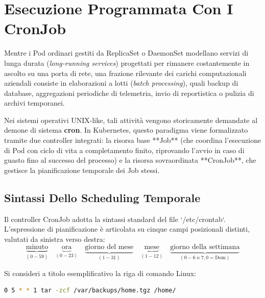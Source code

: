 \documentclass[11pt, a4paper]{article}
\begin{document}
\newpage


\section{Esecuzione Programmata Con I CronJob}

Mentre i Pod ordinari gestiti da ReplicaSet o DaemonSet modellano servizi di lunga durata (\emph{long-running services}) progettati per rimanere costantemente in ascolto su una porta di rete, una frazione rilevante dei carichi computazionali aziendali consiste in elaborazioni a lotti (\emph{batch processing}), quali backup di database, aggregazioni periodiche di telemetria, invio di reportistica o pulizia di archivi temporanei.

Nei sistemi operativi UNIX-like, tali attività vengono storicamente demandate al demone di sistema \textbf{cron}. In Kubernetes, questo paradigma viene formalizzato tramite due controller integrati: la risorsa base **Job** (che coordina l'esecuzione di Pod con ciclo di vita a completamento finito, riprovando l'avvio in caso di guasto fino al successo del processo) e la risorsa sovraordinata **CronJob**, che gestisce la pianificazione temporale dei Job stessi.

\subsection{Sintassi Dello Scheduling Temporale}

Il controller CronJob adotta la sintassi standard del file `/etc/crontab`. L'espressione di pianificazione è articolata su cinque campi posizionali distinti, valutati da sinistra verso destra:
\[
\underbrace{\text{minuto}}_{(0-59)} \quad \underbrace{\text{ora}}_{(0-23)} \quad \underbrace{\text{giorno del mese}}_{(1-31)} \quad \underbrace{\text{mese}}_{(1-12)} \quad \underbrace{\text{giorno della settimana}}_{(0-6 \text{ o } 7, 0=\text{Dom})}
\]

Si consideri a titolo esemplificativo la riga di comando Linux:
\begin{lstlisting}[language=bash]
0 5 * * 1 tar -zcf /var/backups/home.tgz /home/
\end{lstlisting}
\end{document}
